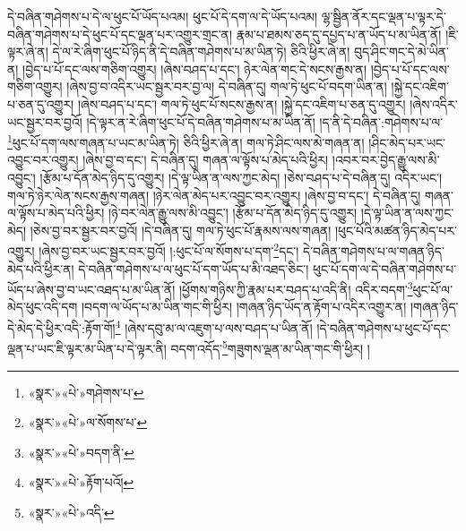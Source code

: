 དེ་བཞིན་གཤེགས་པ་དེ་ལ་ཕུང་པོ་ཡོད་པའམ། ཕུང་པོ་དེ་དག་ལ་དེ་ཡོད་པའམ། ལྷ་སྦྱིན་ནོར་དང་ལྡན་པ་ལྟར་དེ་བཞིན་གཤེགས་པ་དེ་ཕུང་པོ་དང་ལྡན་པར་འགྱུར་གྲང་ན། རྣམ་པ་ཐམས་ཅད་དུ་དཔྱད་པ་ན་ཡོད་པ་མ་ཡིན་ནོ། །ཇི་ལྟར་ཞེ་ན། དེ་ལ་རེ་ཞིག་ཕུང་པོ་ཉིད་ནི་དེ་བཞིན་གཤེགས་པ་མ་ཡིན་ཏེ། ཅིའི་ཕྱིར་ཞེ་ན། བུད་ཤིང་གང་དེ་མེ་ཡིན་ན། །བྱེད་པ་པོ་དང་ལས་གཅིག་འགྱུར། །ཞེས་བཤད་པ་དང་། ཉེར་ལེན་གང་དེ་སངས་རྒྱས་ན། །བྱེད་པ་པོ་དང་ལས་གཅིག་འགྱུར། །ཞེས་བྱ་བ་འདིར་ཡང་སྦྱར་བར་བྱ་ལ། དེ་བཞིན་དུ། གལ་ཏེ་ཕུང་པོ་བདག་ཡིན་ན། །སྐྱེ་དང་འཇིག་པ་ཅན་དུ་འགྱུར། །ཞེས་བཤད་པ་དང་། གལ་ཏེ་ཕུང་པོ་སངས་རྒྱས་ན། །སྐྱེ་དང་འཇིག་པ་ཅན་དུ་འགྱུར། །ཞེས་འདིར་ཡང་སྦྱར་བར་བྱའོ། །དེ་ལྟར་ན་རེ་ཞིག་ཕུང་པོ་དེ་བཞིན་གཤེགས་པ་མ་ཡིན་ནོ། །ད་ནི་དེ་བཞིན་:གཤེགས་པ་ལ་\footnote{«སྣར་»«པེ་»གཤེགས་པ་}ཕུང་པོ་དག་ལས་གཞན་པ་ཡང་མ་ཡིན་ཏེ། ཅིའི་ཕྱིར་ཞེ་ན། གལ་ཏེ་ཤིང་ལས་མེ་གཞན་ན། །ཤིང་མེད་པར་ཡང་འབྱུང་བར་འགྱུར། །ཞེས་བྱ་བ་དང་། དེ་བཞིན་དུ། གཞན་ལ་ལྟོས་པ་མེད་པའི་ཕྱིར། །འབར་བར་བྱེད་རྒྱུ་ལས་མི་འབྱུང་། །རྩོམ་པ་དོན་མེད་ཉིད་དུ་འགྱུར། །དེ་ལྟ་ཡིན་ན་ལས་ཀྱང་མེད། །ཅེས་བཤད་པ་དེ་བཞིན་དུ། འདིར་ཡང་། གལ་ཏེ་ཉེར་ལེན་སངས་རྒྱས་གཞན། །ཉེར་ལེན་མེད་པར་འབྱུང་བར་འགྱུར། །ཞེས་བྱ་བ་དང་། དེ་བཞིན་དུ། གཞན་ལ་ལྟོས་པ་མེད་པའི་ཕྱིར། །ཉེ་བར་ལེན་རྒྱུ་ལས་མི་འབྱུང་། །རྩོམ་པ་དོན་མེད་ཉིད་དུ་འགྱུར། །དེ་ལྟ་ཡིན་ན་ལས་ཀྱང་མེད། །ཅེས་བྱ་བར་སྦྱར་བར་བྱའོ། །དེ་བཞིན་དུ། གལ་ཏེ་ཕུང་པོ་རྣམས་ལས་གཞན། །ཕུང་པོའི་མཚན་ཉིད་མེད་པར་འགྱུར། །ཞེས་བྱ་བར་ཡང་སྦྱར་བར་བྱའོ། །:ཕུང་པོ་ལ་སོགས་པ་དག་\footnote{«སྣར་»«པེ་»ལ་སོགས་པ་}དང་། དེ་བཞིན་གཤེགས་པ་ལ་གཞན་ཉིད་མེད་པའི་ཕྱིར་ན། དེ་བཞིན་གཤེགས་པ་ལ་ཕུང་པོ་དག་ཡོད་པ་མི་འཐད་ཅིང་། ཕུང་པོ་དག་ལ་དེ་བཞིན་གཤེགས་པ་ཡོད་པ་ཞེས་བྱ་བ་ཡང་འཐད་པ་མ་ཡིན་ནོ། །ཕྱོགས་གཉིས་ཀྱི་རྣམ་པར་བཤད་པ་འདི་ནི། འདིར་བདག་\footnote{«སྣར་»«པེ་»བདག་ནི་}ཕུང་པོ་ལ་མེད་ཕུང་འདི་དག །བདག་ལ་ཡོད་པ་མ་ཡིན་གང་གི་ཕྱིར། །གཞན་ཉིད་ཡོད་ན་རྟོག་པ་འདིར་འགྱུར་ན། །གཞན་ཉིད་དེ་མེད་དེ་ཕྱིར་འདི་:རྟོག་གོ།\footnote{«སྣར་»«པེ་»རྟོག་པའོ།} །ཞེས་དབུ་མ་ལ་འཇུག་པ་ལས་བཤད་པ་ཡིན་ནོ། །དེ་བཞིན་གཤེགས་པ་ཕུང་པོ་དང་ལྡན་པ་ཡང་ཇི་ལྟར་མ་ཡིན་པ་དེ་ལྟར་ནི། བདག་འདོད་\footnote{«སྣར་»«པེ་»འདི་}གཟུགས་ལྡན་མ་ཡིན་གང་གི་ཕྱིར། །
